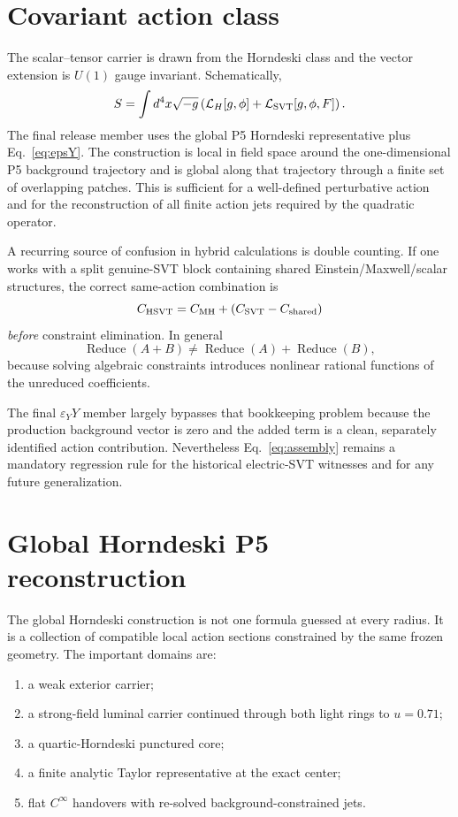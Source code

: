 \documentclass[11pt,a4paper,oneside]{book}
\newcommand{\epsY}{\varepsilon_Y}
\newcommand{\Lag}{\mathcal{L}}
\begin{document}
\chapter{Covariant action class}
The scalar--tensor carrier is drawn from the Horndeski class and the vector extension is $U(1)$ gauge invariant. Schematically,
\begin{equation}
 S=\int d^4x\sqrt{-g}\left(\Lag_H[g,\phi]+\Lag_{\rm SVT}[g,\phi,F]\right).
\end{equation}
The final release member uses the global P5 Horndeski representative plus Eq.~\eqref{eq:epsY}. The construction is local in field space around the one-dimensional P5 background trajectory and is global along that trajectory through a finite set of overlapping patches. This is sufficient for a well-defined perturbative action and for the reconstruction of all finite action jets required by the quadratic operator.

A recurring source of confusion in hybrid calculations is double counting. If one works with a split genuine-SVT block containing shared Einstein/Maxwell/scalar structures, the correct same-action combination is
\begin{equation}
 C_{\rm HSVT}=C_{\rm MH}+\left(C_{\rm SVT}-C_{\rm shared}\right)
 \label{eq:assembly}
\end{equation}
\emph{before} constraint elimination. In general
\begin{equation}
 \operatorname{Reduce}(A+B)\neq \operatorname{Reduce}(A)+\operatorname{Reduce}(B),
\end{equation}
because solving algebraic constraints introduces nonlinear rational functions of the unreduced coefficients.

The final $\epsY Y$ member largely bypasses that bookkeeping problem because the production background vector is zero and the added term is a clean, separately identified action contribution. Nevertheless Eq.~\eqref{eq:assembly} remains a mandatory regression rule for the historical electric-SVT witnesses and for any future generalization.

\chapter{Global Horndeski P5 reconstruction}
The global Horndeski construction is not one formula guessed at every radius. It is a collection of compatible local action sections constrained by the same frozen geometry. The important domains are:
\begin{enumerate}
\item a weak exterior carrier;
\item a strong-field luminal carrier continued through both light rings to $u=0.71$;
\item a quartic-Horndeski punctured core;
\item a finite analytic Taylor representative at the exact center;
\item flat $C^\infty$ handovers with re-solved background-constrained jets.
\end{enumerate}
\end{document}
